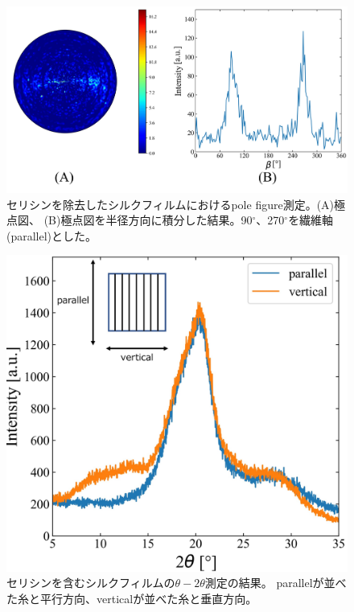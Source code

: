 \documentclass[dvipdfmx,12pt,a4paper]{jreport}
\begin{document}
			\newpage
			\begin{figure}[h]
				\centering
				\includegraphics[width=\linewidth]{pole_figure_silk_fibroin.jpg}
				\caption{セリシンを除去したシルクフィルムにおけるpole figure測定。(A)極点図、
				(B)極点図を半径方向に積分した結果。90$^{\circ}$、270$^{\circ}$を繊維軸(parallel)とした。}
				\label{極点図_結果_without_sericin}
			\end{figure}
			\begin{figure}[H]
				\centering
				\includegraphics[scale=0.75]{theta_2theta_セリシンあり.jpg}
				\caption{セリシンを含むシルクフィルムの$\theta - 2\theta$測定の結果。
				parallelが並べた糸と平行方向、verticalが並べた糸と垂直方向。}
				\label{セリシン含む_theta_2theta}
			\end{figure}
\end{document}
